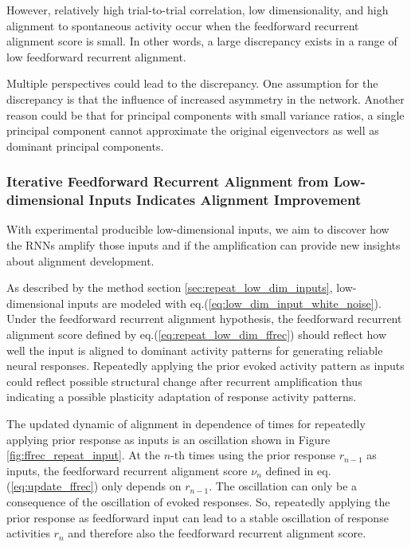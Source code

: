 \documentclass[11pt]{article}
\begin{document}
	However, relatively high trial-to-trial correlation, low dimensionality, and high alignment to spontaneous activity occur when the feedforward recurrent alignment score is small. In other words, a large discrepancy exists in a range of low feedforward recurrent alignment. 
	
	Multiple perspectives could lead to the discrepancy. One assumption for the discrepancy is that the influence of increased asymmetry in the network. Another reason could be that for principal components with small variance ratios, a single principal component cannot approximate the original eigenvectors as well as dominant principal components.
	
	\subsubsection{Iterative Feedforward Recurrent Alignment from Low-dimensional Inputs Indicates Alignment Improvement}
	
	With experimental producible low-dimensional inputs, we aim to discover how the RNNs amplify those inputs and if the amplification can provide new insights about alignment development. 
	
	As described by the method section \ref{sec:repeat_low_dim_inputs}, low-dimensional inputs are modeled with eq.(\ref{eq:low_dim_input_white_noise}). Under the feedforward recurrent alignment hypothesis, the feedforward recurrent alignment score defined by eq.(\ref{eq:repeat_low_dim_ffrec}) should reflect how well the input is aligned to dominant activity patterns for generating reliable neural responses. 
	Repeatedly applying the prior evoked activity pattern as inputs could reflect possible structural change after recurrent amplification thus indicating a possible plasticity adaptation of response activity patterns. 
	
	The updated dynamic of alignment in dependence of times for repeatedly applying prior response as inputs is an oscillation shown in Figure \ref{fig:ffrec_repeat_input}.
	At the $n$-th times using the prior response $r_{n-1}$ as inputs, the feedforward recurrent alignment score $\nu_n$ defined in eq.(\ref{eq:update_ffrec}) only depends on $r_{n-1}$. 
	The oscillation can only be a consequence of the oscillation of evoked responses. So, repeatedly applying the prior response as feedforward input can lead to a stable oscillation of response activities $r_n$ and therefore also the feedforward recurrent alignment score. 
\end{document}
